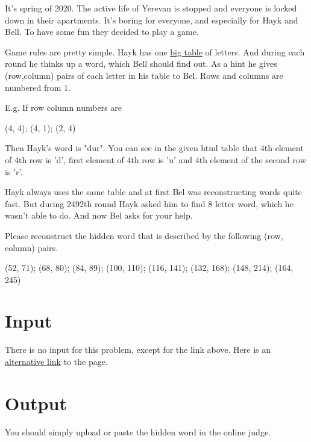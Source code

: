 It's spring of 2020.
The active life of Yerevan is stopped and everyone is locked down in their apartments.
It's boring for everyone, and especially for Hayk and Bell. 
To have some fun they decided to play a game.

Game rules are pretty simple.
Hayk has one \href{http://ejudge.rau.am/ejudge/hayktable.html}{big table} of letters. And during each round he thinks up a word, which Bell should find out. As a hint he gives (row,column) pairs of each letter in his table to Bel.
Rows and columns are numbered from 1.

E.g. If row column numbers are

(4, 4); (4, 1); (2, 4)


Then Hayk's word is "dur".
You can see in the given html table that 4th element of 4th row is 'd', first element of 4th row is 'u' and 4th element of the second row is 'r'.

Hayk always uses the same table and at first Bel was reconstructing words quite fast.
But during 2492th round Hayk asked him to find 8 letter word, which he wasn't able to do.
And now Bel asks for your help.

Please reconstruct the hidden word that is described by the following (row, column) pairs.

(52, 71); (68, 80); (84, 89); (100, 110); (116, 141); (132, 168); (148, 214); (164, 245)

\section*{Input}
There is no input for this problem, except for the link above.
Here is an \href{http://167.71.248.201/ejudge/hayktable.html}{alternative link} to the page.

\section*{Output}
You should simply upload or paste the hidden word in the online judge. 